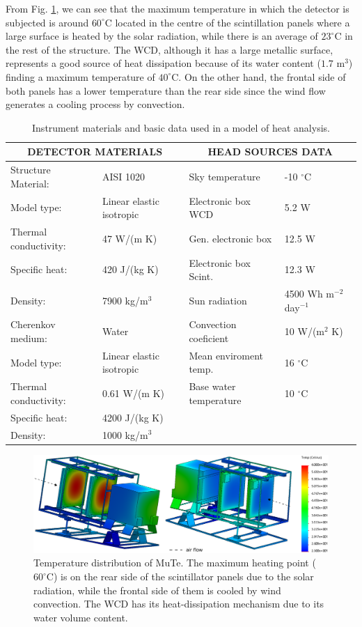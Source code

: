 \documentclass[letterpaper,11pt]{article}
\begin{document}
From Fig. \ref{fig:temp_graph}, we can see that the maximum temperature in which the detector is subjected is around $60^{\circ}$C located in the centre of the scintillation panels where a large surface is heated by the solar radiation, while there is an average of $23^{\circ}$C in the rest of the structure. The WCD, although it has a large metallic surface, represents a good source of heat dissipation because of its water content ($1.7$ m$^3$) finding a maximum temperature of $40^{\circ}$C. On the other hand, the frontal side of both panels has a lower temperature than the rear side since the wind flow generates a cooling process by convection. 

\begin{table}[!ht]
\begin{center}
\begin{tabular}{ll|ll}
\hline
\multicolumn{2}{c}{\bf DETECTOR MATERIALS} & \multicolumn{2}{|c}{\bf HEAD SOURCES DATA}\\
\hline
Structure Material: & AISI 1020 & Sky temperature & -10 $^{\circ}$C \\
Model type: & Linear elastic isotropic & Electronic box WCD & 5.2 W \\
Thermal conductivity: & 47 W/(m K) & Gen. electronic box & 12.5 W \\
Specific heat: & 420 J/(kg K) & Electronic box Scint. & 12.3 W \\
Density: & 7900 kg/m$^3$ & Sun radiation & 4500 Wh m$^{-2}$ day$^{-1}$ \\
Cherenkov medium: & Water & Convection coeficient & 10 W/(m$^2$ K) \\
Model type: & Linear elastic isotropic & Mean enviroment temp. & 16 $^{\circ}$C \\
Thermal conductivity: & 0.61 W/(m K) & Base water temperature & 10 $^{\circ}$C \\
Specific heat: & 4200 J/(kg K) & & \\
Density: & 1000 kg/m$^3$ & & \\ 
\hline
\end{tabular}
\end{center}
\caption{Instrument materials and basic data used in a model of heat analysis.}
\label{instr_mat}
\end{table}

\begin{figure}[htb]
\centering
\includegraphics[width=1\columnwidth]{Figures/MuTe_Temp.eps}
\caption{Temperature distribution of MuTe. The maximum heating point ($60^{\circ}$C) is on the rear side of the scintillator panels due to the solar radiation, while the frontal side of them is cooled by wind convection. The WCD has its heat-dissipation mechanism due to its water volume content.}
\label{fig:temp_graph}
\end{figure}
\end{document}
